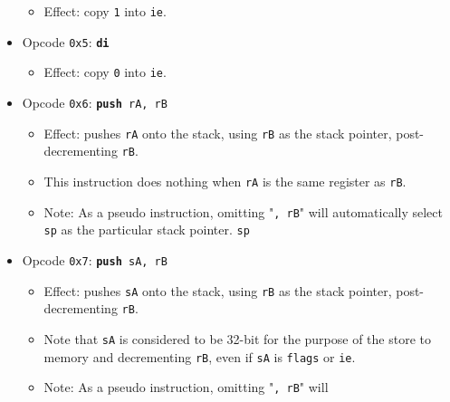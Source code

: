 \documentclass{article}
\begin{document}
\begin{itemize}
\begin{itemize}
		\item Effect: copy \texttt{1} into \texttt{ie}.
		\end{itemize}
	\item Opcode \texttt{0x5}:
		\texttt{\textbf{di}}
		\begin{itemize}
		\item Effect: copy \texttt{0} into \texttt{ie}.
		\end{itemize}
	\item Opcode \texttt{0x6}:
		\texttt{\textbf{push} rA, rB}
		\begin{itemize}
		\item Effect: pushes \texttt{rA} onto the stack, using
		\texttt{rB} as the stack pointer, post-decrementing
		\texttt{rB}.
		\item This instruction does nothing when \texttt{rA} is the
		same register as \texttt{rB}. 
		\item Note: As a pseudo instruction, omitting "\texttt{, rB}" will
			automatically select \texttt{sp} as the particular stack
			pointer. 
		\texttt{sp}
		\end{itemize}
	\item Opcode \texttt{0x7}:
		\texttt{\textbf{push} sA, rB}
		\begin{itemize}
		\item Effect: pushes \texttt{sA} onto the stack, using
		\texttt{rB} as the stack pointer, post-decrementing
		\texttt{rB}.
		\item Note that \texttt{sA} is considered to be 32-bit for the
		purpose of the store to memory and decrementing \texttt{rB},
		even if \texttt{sA} is \texttt{flags} or \texttt{ie}.
		\item Note: As a pseudo instruction, omitting "\texttt{, rB}" will

\end{itemize}
\end{itemize}
\end{document}
